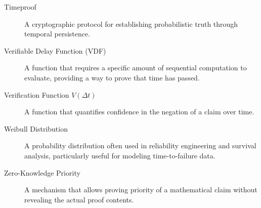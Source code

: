 \documentclass[12pt]{report}
\begin{document}
\begin{description}
    \item[Timeproof] A cryptographic protocol for establishing probabilistic truth through temporal persistence.
    \item[Verifiable Delay Function (VDF)] A function that requires a specific amount of sequential computation to evaluate, providing a way to prove that time has passed.
    \item[Verification Function \( V(\Delta t) \)] A function that quantifies confidence in the negation of a claim over time.
    \item[Weibull Distribution] A probability distribution often used in reliability engineering and survival analysis, particularly useful for modeling time-to-failure data.
    \item[Zero-Knowledge Priority] A mechanism that allows proving priority of a mathematical claim without revealing the actual proof contents.
\end{description}
\end{document}
